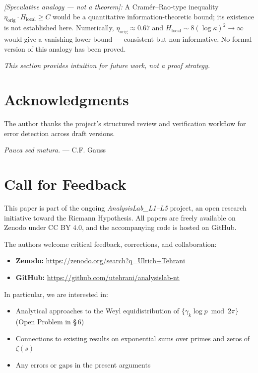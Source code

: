 \documentclass[11pt]{article}
\newcommand{\etaorig}{\eta_{\mathrm{orig}}}
\begin{document}
\emph{[Speculative analogy --- not a theorem]:}
A Cram\'er--Rao-type inequality
$\etaorig\cdot H_{\mathrm{local}}\geq C$ would be a quantitative
information-theoretic bound; its existence is not established here.
Numerically, $\etaorig\approx 0.67$ and
$H_{\mathrm{local}}\sim 8(\log\kappa)^2\to\infty$ would give a
vanishing lower bound --- consistent but non-informative.
No formal version of this analogy has been proved.

\emph{This section provides intuition for future work, not a proof strategy.}

\section*{Acknowledgments}

The author thanks the project's structured review and verification
workflow for error detection across draft versions.

\emph{Pauca sed matura.} --- C.F. Gauss

\section*{Call for Feedback}

This paper is part of the ongoing \textit{AnalysisLab\_L1--L5} project,
an open research initiative toward the Riemann Hypothesis.
All papers are freely available on Zenodo under CC BY 4.0,
and the accompanying code is hosted on GitHub.

The authors welcome critical feedback, corrections, and collaboration:

\begin{itemize}
\item \textbf{Zenodo:} \url{https://zenodo.org/search?q=Ulrich+Tehrani}
\item \textbf{GitHub:} \url{https://github.com/utehrani/analysislab-nt}
\end{itemize}

In particular, we are interested in:
\begin{itemize}
\item Analytical approaches to the Weyl equidistribution
  of $\{\gamma_k\log p\bmod 2\pi\}$ (Open Problem in \S\,6)
\item Connections to existing results on exponential sums
  over primes and zeros of $\zeta(s)$
\item Any errors or gaps in the present arguments
\end{itemize}
\end{document}
